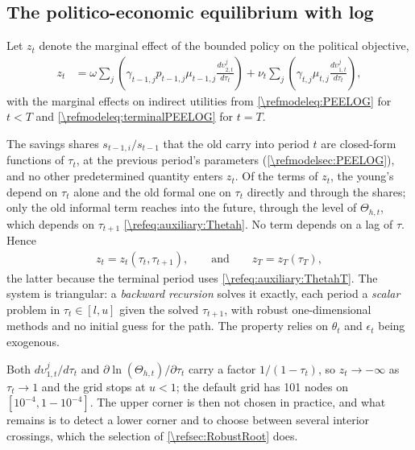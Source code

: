 \subsection{The politico-economic equilibrium with log}\label{\refsec:PEELOG}
Let $z_t$ denote the marginal effect of the bounded policy on the political objective,
\begin{align}\label{\refeq:LOG:fast}
    z_t &= \omega\sum_{j}\left(\gamma_{t-1,j}p_{t-1,j}\mu_{t-1,j} \frac{d\upsilon_{2,t}^j}{d\tau_t}\right)+\nu_t\sum_j\left(\gamma_{t,j}\mu_{t,j} \frac{d\upsilon_{1,t}^j}{d\tau_t}\right),
\end{align}
with the marginal effects on indirect utilities from \eqref{\refmodeleq:PEELOG} for $t<T$ and \eqref{\refmodeleq:terminalPEELOG} for $t=T$.

The savings shares $s_{t-1,i}/s_{t-1}$ that the old carry into period $t$ are closed-form functions of $\tau_t$, at the previous period's parameters (\cref{\refmodelsec:PEELOG}), and no other predetermined quantity enters $z_t$. Of the terms of $z_t$, the young's depend on $\tau_t$ alone and the old formal one on $\tau_t$ directly and through the shares; only the old informal term reaches into the future, through the level of $\Theta_{h,t}$, which depends on $\tau_{t+1}$ \eqref{\refeq:auxiliary:Thetah}. No term depends on a lag of $\tau$. Hence
\begin{align}\label{\refeq:recursive}
    z_t = z_t\left(\tau_t, \tau_{t+1}\right), \qquad\text{and}\qquad z_T = z_T(\tau_T),
\end{align}
the latter because the terminal period uses \eqref{\refeq:auxiliary:ThetahT}. The system is triangular: a \emph{backward recursion} solves it exactly, each period a \emph{scalar} problem in $\tau_t\in[l,u]$ given the solved $\tau_{t+1}$, with robust one-dimensional methods and no initial guess for the path. The property relies on $\theta_t$ and $\epsilon_t$ being exogenous.

Both $d\upsilon_{1,t}^j/d\tau_t$ and $\partial \ln(\Theta_{h,t})/\partial\tau_t$ carry a factor $1/(1-\tau_t)$, so $z_t\rightarrow -\infty$ as $\tau_t\rightarrow 1$ and the grid stops at $u<1$; the default grid has 101 nodes on $[10^{-4}, 1-10^{-4}]$. The upper corner is then not chosen in practice, and what remains is to detect a lower corner and to choose between several interior crossings, which the selection of \cref{\refsec:RobustRoot} does.

